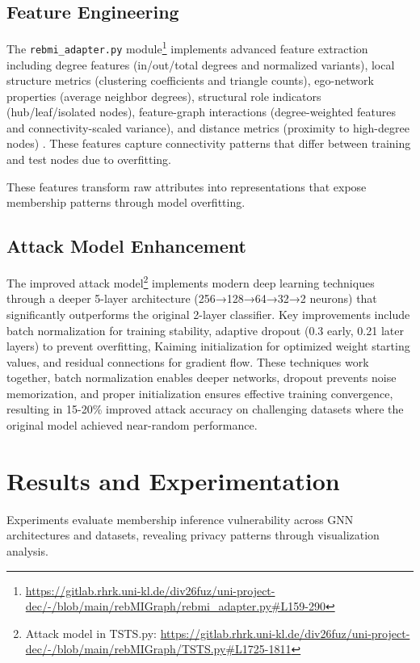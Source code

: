 \documentclass{article}
\begin{document}
\subsection{Feature Engineering}
The \texttt{rebmi\_adapter.py} module\footnote{\url{https://gitlab.rhrk.uni-kl.de/div26fuz/uni-project-dec/-/blob/main/rebMIGraph/rebmi_adapter.py\#L159-290}} implements advanced feature extraction including degree features (in/out/total degrees and normalized variants), local structure metrics (clustering coefficients and triangle counts), ego-network properties (average neighbor degrees), structural role indicators (hub/leaf/isolated nodes), feature-graph interactions (degree-weighted features and connectivity-scaled variance), and distance metrics (proximity to high-degree nodes) \cite{he2021membership, olatunji2021membershipinferenceattackgraph}. These features capture connectivity patterns that differ between training and test nodes due to overfitting.

These features transform raw attributes into representations that expose membership patterns through model overfitting.

\subsection{Attack Model Enhancement}
The improved attack model\footnote{Attack model in TSTS.py: \url{https://gitlab.rhrk.uni-kl.de/div26fuz/uni-project-dec/-/blob/main/rebMIGraph/TSTS.py\#L1725-1811}} implements modern deep learning techniques \cite{he2015delving} through a deeper 5-layer architecture (256→128→64→32→2 neurons) that significantly outperforms the original 2-layer classifier. Key improvements include batch normalization for training stability, adaptive dropout (0.3 early, 0.21 later layers) to prevent overfitting, Kaiming initialization for optimized weight starting values, and residual connections for gradient flow. These techniques work together, batch normalization enables deeper networks, dropout prevents noise memorization, and proper initialization ensures effective training convergence, resulting in 15-20\% improved attack accuracy on challenging datasets where the original model achieved near-random performance.

\section{Results and Experimentation}
\label{results}
Experiments evaluate membership inference vulnerability across GNN architectures and datasets, revealing privacy patterns through visualization analysis.
\end{document}
